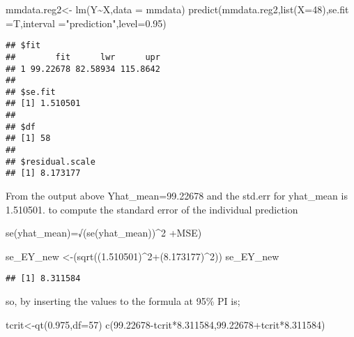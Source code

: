 \documentclass[
]{article}
\newenvironment{Shaded}{\begin{snugshade}}{\end{snugshade}}
\newcommand{\AttributeTok}[1]{\textcolor[rgb]{0.77,0.63,0.00}{#1}}
\newcommand{\DecValTok}[1]{\textcolor[rgb]{0.00,0.00,0.81}{#1}}
\newcommand{\FloatTok}[1]{\textcolor[rgb]{0.00,0.00,0.81}{#1}}
\newcommand{\FunctionTok}[1]{\textcolor[rgb]{0.00,0.00,0.00}{#1}}
\newcommand{\NormalTok}[1]{#1}
\newcommand{\OtherTok}[1]{\textcolor[rgb]{0.56,0.35,0.01}{#1}}
\newcommand{\SpecialCharTok}[1]{\textcolor[rgb]{0.00,0.00,0.00}{#1}}
\newcommand{\StringTok}[1]{\textcolor[rgb]{0.31,0.60,0.02}{#1}}
\begin{document}
\begin{Shaded}
\begin{Highlighting}[]
\NormalTok{mmdata.reg2}\OtherTok{\textless{}{-}} \FunctionTok{lm}\NormalTok{(Y}\SpecialCharTok{\textasciitilde{}}\NormalTok{X,}\AttributeTok{data =}\NormalTok{ mmdata)}
\FunctionTok{predict}\NormalTok{(mmdata.reg2,}\FunctionTok{list}\NormalTok{(}\AttributeTok{X=}\DecValTok{48}\NormalTok{),}\AttributeTok{se.fit =}\NormalTok{T,}\AttributeTok{interval =}\StringTok{"prediction"}\NormalTok{,}\AttributeTok{level=}\FloatTok{0.95}\NormalTok{)}
\end{Highlighting}
\end{Shaded}

\begin{verbatim}
## $fit
##        fit      lwr      upr
## 1 99.22678 82.58934 115.8642
## 
## $se.fit
## [1] 1.510501
## 
## $df
## [1] 58
## 
## $residual.scale
## [1] 8.173177
\end{verbatim}

From the output above Yhat\_mean=99.22678 and the std.err for yhat\_mean
is 1.510501. to compute the standard error of the individual prediction

se(yhat\_mean)=√(se(yhat\_mean))\^{}2 +MSE)

\begin{Shaded}
\begin{Highlighting}[]
\NormalTok{se\_EY\_new }\OtherTok{\textless{}{-}}\NormalTok{(}\FunctionTok{sqrt}\NormalTok{((}\FloatTok{1.510501}\NormalTok{)}\SpecialCharTok{\^{}}\DecValTok{2}\SpecialCharTok{+}\NormalTok{(}\FloatTok{8.173177}\NormalTok{)}\SpecialCharTok{\^{}}\DecValTok{2}\NormalTok{))}
\NormalTok{se\_EY\_new}
\end{Highlighting}
\end{Shaded}

\begin{verbatim}
## [1] 8.311584
\end{verbatim}

so, by inserting the values to the formula at 95\% PI is;

\begin{Shaded}
\begin{Highlighting}[]
\NormalTok{tcrit}\OtherTok{\textless{}{-}}\FunctionTok{qt}\NormalTok{(}\FloatTok{0.975}\NormalTok{,}\AttributeTok{df=}\DecValTok{57}\NormalTok{)}
\FunctionTok{c}\NormalTok{(}\FloatTok{99.22678}\SpecialCharTok{{-}}\NormalTok{tcrit}\SpecialCharTok{*}\FloatTok{8.311584}\NormalTok{,}\FloatTok{99.22678}\SpecialCharTok{+}\NormalTok{tcrit}\SpecialCharTok{*}\FloatTok{8.311584}\NormalTok{)}
\end{Highlighting}
\end{Shaded}
\end{document}
